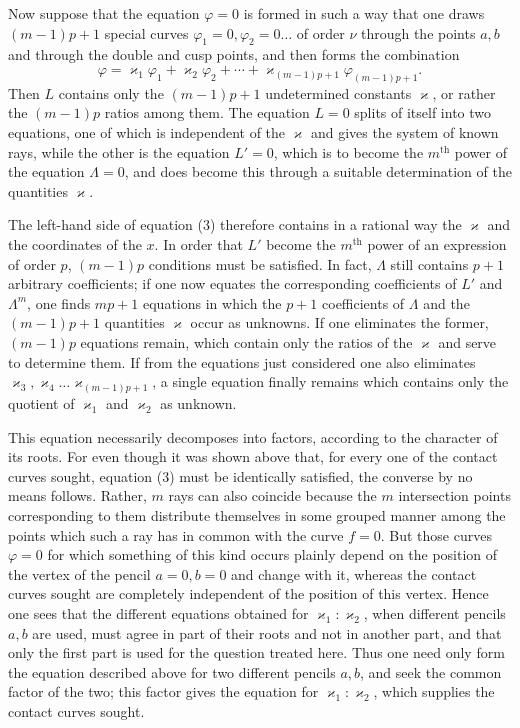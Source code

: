 \documentclass[10pt]{article}
\begin{document}
Now suppose that the equation \(\varphi=0\) is formed in such a way that one draws \((m-1)p+1\) special curves \(\varphi_1=0,\varphi_2=0\ldots\) of order \(\nu\) through the points \(a,b\) and through the double and cusp points, and then forms the combination
\[
\varphi=\varkappa_1\varphi_1+\varkappa_2\varphi_2+\cdots+
\varkappa_{(m-1)p+1}\varphi_{(m-1)p+1}.
\]
Then \(L\) contains only the \((m-1)p+1\) undetermined constants \(\varkappa\), or rather the \((m-1)p\) ratios among them. The equation \(L=0\) splits of itself into two equations, one of which is independent of the \(\varkappa\) and gives the system of known rays, while the other is the equation \(L'=0\), which is to become the \(m^{\text{th}}\) power of the equation \(\Lambda=0\), and does become this through a suitable determination of the quantities \(\varkappa\).

The left-hand side of equation (3) therefore contains in a rational way the \(\varkappa\) and the coordinates of the \(x\). In order that \(L'\) become the \(m^{\text{th}}\) power of an expression of order \(p\), \((m-1)p\) conditions must be satisfied. In fact, \(\Lambda\) still contains \(p+1\) arbitrary coefficients; if one now equates the corresponding coefficients of \(L'\) and \(\Lambda^m\), one finds \(mp+1\) equations in which the \(p+1\) coefficients of \(\Lambda\) and the \((m-1)p+1\) quantities \(\varkappa\) occur as unknowns. If one eliminates the former, \((m-1)p\) equations remain, which contain only the ratios of the \(\varkappa\) and serve to determine them. If from the equations just considered one also eliminates \(\varkappa_3,\varkappa_4\ldots\varkappa_{(m-1)p+1}\), a single equation finally remains which contains only the quotient of \(\varkappa_1\) and \(\varkappa_2\) as unknown.

This equation necessarily decomposes into factors, according to the character of its roots. For even though it was shown above that, for every one of the contact curves sought, equation (3) must be identically satisfied, the converse by no means follows. Rather, \(m\) rays can also coincide because the \(m\) intersection points corresponding to them distribute themselves in some grouped manner among the points which such a ray has in common with the curve \(f=0\). But those curves \(\varphi=0\) for which something of this kind occurs plainly depend on the position of the vertex of the pencil \(a=0,b=0\) and change with it, whereas the contact curves sought are completely independent of the position of this vertex. Hence one sees that the different equations obtained for \(\varkappa_1:\varkappa_2\), when different pencils \(a,b\) are used, must agree in part of their roots and not in another part, and that only the first part is used for the question treated here. Thus one need only form the equation described above for two different pencils \(a,b\), and seek the common factor of the two; this factor gives the equation for \(\varkappa_1:\varkappa_2\), which supplies the contact curves sought.
\end{document}
